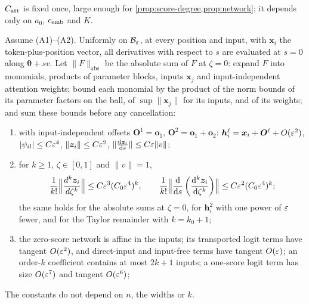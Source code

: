 $C_{\mathrm{att}}$ is fixed once, large enough for \cref{prop:score-degree,prop:network}; it depends only on $a_0$, $c_{\mathrm{emb}}$ and $K$.

\label{app:network}

\begin{proposition}
\label{prop:network}
Assume (A1)--(A2). Uniformly on $\mathcal B_{\varepsilon}$, at every position and input, with $\bm x_i$ the token-plus-position vector,
all derivatives with respect to $s$ are evaluated at $s=0$ along $\bm\theta+sv$.
Let $\|F\|_{\mathrm{abs}}$ be the absolute sum of $F$ at $\zeta=0$: expand $F$ into monomials, products of
parameter blocks, inputs $\bm x_j$ and input-independent attention weights; bound each monomial by the product of the norm bounds of its
parameter factors on the ball, of $\sup\|\bm x_j\|$ for its inputs, and of its weights; and sum these bounds before any cancellation:
\begin{enumerate}[label=(\roman*),leftmargin=*,itemsep=3pt,topsep=4pt]
\item with input-independent offsets $\bm O^1=\bm o_1$, $\bm O^2=\bm o_1+\bm o_2$: $\bm h_i^\ell=\bm x_i+\bm O^\ell+O(\varepsilon^2)$, $|\psi_{il}|\le C\varepsilon^4$,
$\|\bm z_i\|\le C\varepsilon^2$, $\|\dd{\bm z_i}{s}\|\le C\initscale\|v\|$;
\item for $k\ge1$, $\zeta\in[0,1]$ and $\|v\|=1$,
\[
 \frac{1}{k!}\Bigl\|\frac{d^k\bm z_i}{d\zeta^k}\Bigr\|\le C\initscale^3(C_0\initscale^4)^k,\qquad
 \frac{1}{k!}\Bigl\|\dd{}{s}\left(\frac{\mathrm d^k\bm z_i}{\mathrm d\zeta^k}\right)\Bigr\|\le C\initscale^2(C_0\initscale^4)^k;
\]
the same holds for the absolute sums at $\zeta=0$, for $\bm h^2_i$ with one power of $\varepsilon$ fewer, and for the Taylor remainder with $k=k_0+1$;
\item the zero-score network is affine in the inputs; its transported logit terms have tangent $O(\varepsilon^2)$, and direct-input and
input-free terms have tangent $O(\varepsilon)$; an order-$k$ coefficient contains at most $2k+1$ inputs; a one-score logit term has size
$O(\varepsilon^7)$ and tangent $O(\varepsilon^6)$;
\end{enumerate}
The constants do not depend on $n$, the widths or $k$.
\end{proposition}

